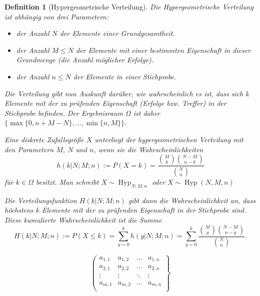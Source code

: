 \documentclass[titlepage]{scrartcl}
\DeclareMathOperator{\Hyp}{Hyp}
\theoremstyle{das_hat_stil}
\newtheorem{definition}{Definition}
\begin{document}
\begin{definition}[Hypergeometrische Verteilung]
  Die Hypergeometrische Verteilung ist abhängig von drei Parametern:
  \begin{itemize}
    \item der Anzahl $N$ der Elemente einer Grundgesamtheit.
    \item der Anzahl $M \leq N$ der Elemente mit einer bestimmten Eigenschaft in dieser Grundmenge (die Anzahl möglicher Erfolge).
    \item der Anzahl $n \leq N$ der Elemente in einer Stichprobe.
  \end{itemize}
  Die Verteilung gibt nun Auskunft darüber, wie wahrscheinlich es ist, dass sich $k$ Elemente mit der zu prüfenden Eigenschaft (Erfolge bzw. Treffer) in der Stichprobe befinden. Der Ergebnisraum $\Omega$ ist daher $\{\max\{0, n + M - N\}, \dots , \min\{n, M\} \}$.

  Eine diskrete Zufallsgröße $X$ unterliegt der hypergeometrischen Verteilung mit den Parametern $M$, $N$ und $n$, wenn sie die Wahrscheinlichkeiten
  \[
    h(k | N; M; n) := P(X = k) = \frac{\binom{M}{k} \binom{N-M}{n-k}}{\binom{N}{n}}
  \]
  für $k \in \Omega$ besitzt. Man schreibt $X \sim \Hyp_{N;M;n}$ oder $X \sim \Hyp (N,M,n)$ %

  Die Verteilungsfunktion $H(k | N; M; n)$ gibt dann die Wahrscheinlichkeit an, dass höchstens $k$ Elemente mit der zu prüfenden Eigenschaft in der Stichprobe sind. Diese kumulierte Wahrscheinlichkeit ist die Summe
  \[
  H(k | N; M; n) := P(X \leq k) = \sum_{y=0}^{k} h(y | N; M; n) = \sum_{y=0}^{k} \frac{\binom{M}{y} \binom{N-M}{n-y}}{\binom{N}{n}}.
  \]
\end{definition}


\[
  \left(
  \begin{matrix}
    a_{1,1} & a_{1,2} & \dots & a_{1,n} \\
    a_{2,1} & a_{2,2} & \dots & a_{2,n} \\
    \vdots & \vdots & \ddots & \vdots \\
    a_{m,1} & a_{m,2} & \dots & a_{m,n} \\
  \end{matrix}
  \right\}
\]
\end{document}
